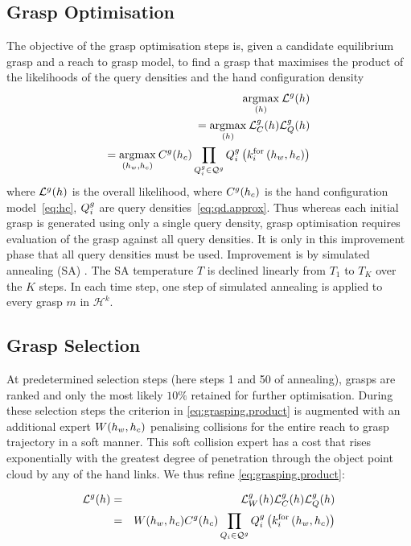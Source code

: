 \subsection{Grasp Optimisation}
The objective of the grasp optimisation steps is, given a candidate equilibrium grasp and a reach to grasp model, to find a grasp that maximises the product of the likelihoods of the query densities and the hand configuration density
\begin{align}
\underset{(h)}{\operatorname{argmax}}\medspace  \mathcal{L}^g(h) & \\
 = \underset{(h)}{\operatorname{argmax}}\medspace  \mathcal{L}^g_C(h) \mathcal{L}^g_Q(h) \\
 = \underset{(h_w, h_c)}{\operatorname{argmax}}\medspace   C^{g}(h_c) \prod_{Q_i^g \in \mathcal{Q}^g} Q_i^g\left(k_{i}^{\mathrm{for}}\left(h_w, h_c\right)\right)
\label{eq:grasping.product}
\end{align}
where ${\cal L}^g(h)$ is the overall likelihood, where $C^g(h_c)$ is the hand configuration model~\eqref{eq:hc}, $Q_i^g$ are query densities~\eqref{eq:qd.approx}. Thus whereas each initial grasp is generated using only a single query density, grasp optimisation requires evaluation of the grasp against all query densities. It is only in this improvement phase that all query densities must be used. Improvement is by simulated annealing (SA) \cite{kirkpatrick83optimizationby}. The SA temperature $T$ is declined linearly from $T_{1}$ to $T_{K}$ over the $K$ steps. In each time step, one step of simulated annealing is applied to every grasp $m$ in $\mathcal{H}^k$.
 
 \subsection{Grasp Selection}
At predetermined selection steps (here steps 1 and 50 of annealing), grasps are ranked and only the most likely $10\%$ retained for further optimisation. During these selection steps the criterion in \eqref{eq:grasping.product} is augmented with an additional expert $W(h_w, h_c)$ penalising collisions for the entire reach to grasp trajectory in a soft manner. This soft collision expert has a cost that rises exponentially with the greatest degree of penetration through the object point cloud by any of the hand links. We thus refine \eq\ref{eq:grasping.product}:

\begin{eqnarray}
{\cal L}^g(h) & = & {\cal L}^g_\coll(h) {\cal L}^g_\hc(h) {\cal L}^g_\qd(h)
\label{eq:grasping.likelihood} \\
                    & = & \coll(h_w, h_c) \hc^g(h_c) \prod_{\qd_i \in \mathcal{Q}^{g}} \qd^g_i\left(k_{i}^{\mathrm{for}}\left(h_w, h_c\right)\right)
\end{eqnarray}

